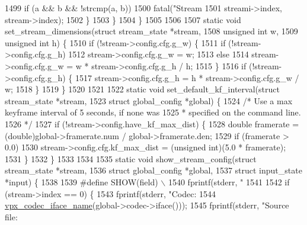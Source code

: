 \begin{DoxyCodeInclude}
{{{{{{{{{{{{{{{{{{{{{{{{{{{{{{{{{{{{{{{{1499       \textcolor{keywordflow}{if} (a && b && !strcmp(a, b))
1500         fatal(\textcolor{stringliteral}{"Stream %
1501               streami->index, stream->index);
1502     \}
1503   \}
1504 \}
1505 
1506 
1507 \textcolor{keyword}{static} \textcolor{keywordtype}{void} set\_stream\_dimensions(\textcolor{keyword}{struct} stream\_state *stream,
1508                                   \textcolor{keywordtype}{unsigned} \textcolor{keywordtype}{int} w,
1509                                   \textcolor{keywordtype}{unsigned} \textcolor{keywordtype}{int} h) \{
1510   \textcolor{keywordflow}{if} (!stream->config.cfg.g\_w) \{
1511     \textcolor{keywordflow}{if} (!stream->config.cfg.g\_h)
1512       stream->config.cfg.g\_w = w;
1513     \textcolor{keywordflow}{else}
1514       stream->config.cfg.g\_w = w * stream->config.cfg.g\_h / h;
1515   \}
1516   \textcolor{keywordflow}{if} (!stream->config.cfg.g\_h) \{
1517     stream->config.cfg.g\_h = h * stream->config.cfg.g\_w / w;
1518   \}
1519 \}
1520 
1521 
1522 \textcolor{keyword}{static} \textcolor{keywordtype}{void} set\_default\_kf\_interval(\textcolor{keyword}{struct} stream\_state  *stream,
1523                                     \textcolor{keyword}{struct} global\_config *global) \{
1524   \textcolor{comment}{/* Use a max keyframe interval of 5 seconds, if none was}
1525 \textcolor{comment}{   * specified on the command line.}
1526 \textcolor{comment}{   */}
1527   \textcolor{keywordflow}{if} (!stream->config.have\_kf\_max\_dist) \{
1528     \textcolor{keywordtype}{double} framerate = (double)global->framerate.num / global->framerate.den;
1529     if (framerate > 0.0)
1530       stream->config.cfg.kf\_max\_dist = (\textcolor{keywordtype}{unsigned} int)(5.0 * framerate);
1531   \}
1532 \}
1533 
1534 
1535 \textcolor{keyword}{static} \textcolor{keywordtype}{void} show\_stream\_config(\textcolor{keyword}{struct} stream\_state  *stream,
1536                                \textcolor{keyword}{struct} global\_config *global,
1537                                \textcolor{keyword}{struct} input\_state   *input) \{
1538 
1539 \textcolor{preprocessor}{#define SHOW(field) \(\backslash\)}
1540 \textcolor{preprocessor}{  fprintf(stderr, "    %
1541 
1542   \textcolor{keywordflow}{if} (stream->index == 0) \{
1543     fprintf(stderr, \textcolor{stringliteral}{"Codec: %
1544             \hyperlink{group__codec_ga9eee39f450d8cdcf5aba0e2bda6e5aa8}{vpx\_codec\_iface\_name}(global->codec->iface()));
1545     fprintf(stderr, \textcolor{stringliteral}{"Source file: %
}}}}}}}}}}}}}}}}}}}}}}}}}}}}}}}}}}}}}}}}}}}}
\end{DoxyCodeInclude}
